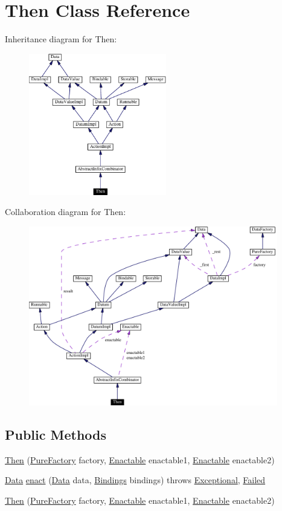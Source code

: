 \hypertarget{classThen}{
\section{Then  Class Reference}
\label{classThen}
}
Inheritance diagram for Then:\begin{figure}[H]
\begin{center}
\leavevmode
\includegraphics[width=170pt]{classThen__inherit__graph}
\end{center}
\end{figure}
Collaboration diagram for Then:\begin{figure}[H]
\begin{center}
\leavevmode
\includegraphics[width=308pt]{classThen__coll__graph}
\end{center}
\end{figure}
\subsection*{Public Methods}
\begin{CompactItemize}
\item 
\hyperlink{classThen_a0}{Then} (\hyperlink{classPureFactory}{Pure\-Factory} factory, \hyperlink{interfaceEnactable}{Enactable} enactable1, \hyperlink{interfaceEnactable}{Enactable} enactable2)
\item 
\hyperlink{interfaceData}{Data} \hyperlink{classThen_a1}{enact} (\hyperlink{interfaceData}{Data} data, \hyperlink{interfaceBindings}{Bindings} bindings) throws \hyperlink{classExceptional}{Exceptional}, \hyperlink{classFailed}{Failed}
\item 
\hyperlink{classThen_a2}{Then} (\hyperlink{classPureFactory}{Pure\-Factory} factory, \hyperlink{interfaceEnactable}{Enactable} enactable1, \hyperlink{interfaceEnactable}{Enactable} enactable2)
\end{CompactItemize}


